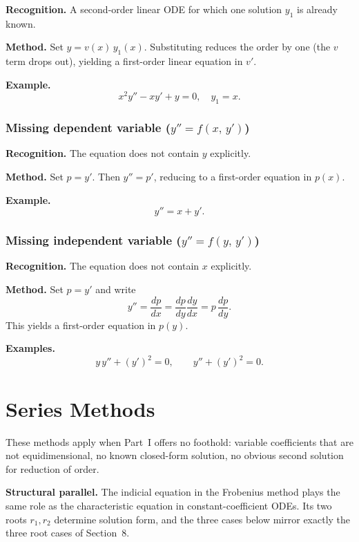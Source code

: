 \documentclass{essay}
\begin{document}
\textbf{Recognition.}  A second-order linear ODE for which one solution \(y_{1}\) is already known.

\textbf{Method.}  Set \(y = v(x)\,y_{1}(x)\).  Substituting reduces the order by one (the \(v\) term drops out), yielding a first-order linear equation in \(v'\).

\textbf{Example.}
\[ x^{2} y'' - xy' + y = 0, \quad y_{1} = x. \]

\section{Missing dependent variable (\(y'' = f(x,\, y')\))}

\textbf{Recognition.}  The equation does not contain \(y\) explicitly.

\textbf{Method.}  Set \(p = y'\).  Then \(y'' = p'\), reducing to a first-order equation in \(p(x)\).

\textbf{Example.}
\[ y'' = x + y'. \]

\section{Missing independent variable (\(y'' = f(y,\, y')\))}

\textbf{Recognition.}  The equation does not contain \(x\) explicitly.

\textbf{Method.}  Set \(p = y'\) and write
\[ y'' = \frac{dp}{dx} = \frac{dp}{dy}\frac{dy}{dx} = p\,\frac{dp}{dy}. \]
This yields a first-order equation in \(p(y)\).

\textbf{Examples.}
\[ y\,y'' + (y')^{2} = 0, \qquad y'' + (y')^{2} = 0. \]

\part{Series Methods}

These methods apply when Part~I offers no foothold: variable coefficients that are not equidimensional, no known closed-form solution, no obvious second solution for reduction of order.

\medskip
\noindent\textbf{Structural parallel.}  The indicial equation in the Frobenius method plays the same role as the characteristic equation in constant-coefficient ODEs.  Its two roots \(r_{1}, r_{2}\) determine solution form, and the three cases below mirror exactly the three root cases of Section~8.
\end{document}
